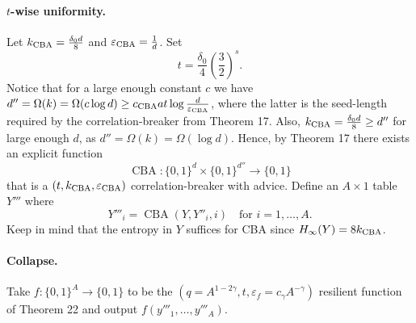 \documentclass[10pt,a4paper]{article}
\DeclareMathOperator{\CBA}{CBA}
\begin{document}
\paragraph{$t$-wise uniformity.} Let $k_{\rm CBA}=\frac{\delta_0d}8$ and $\varepsilon_{\rm CBA}=\frac1d$. Set
\[t=\frac{\delta_0}4\left(\frac32\right)^s.\]
Notice that for a large enough constant $c$ we have $d''=\Omega(k)=\Omega(c\log d)\ge c_{\rm CBA}at\log\frac d{\varepsilon_{\rm CBA}}$, where the latter is the seed-length required by the correlation-breaker from Theorem 17. Also, $k_{\rm CBA}=\frac{\delta_0d}8\ge d''$ for large enough $d$, as $d''=\Omega(k)=\Omega(\log d)$. Hence, by Theorem 17 there exists an explicit function
\[\CBA:\{0,1\}^d\times\{0,1\}^{d''}\to\{0,1\}\]
that is a $(t,k_{\rm CBA},\varepsilon_{\rm CBA})$ correlation-breaker with advice.
Define an $A\times1$ table $Y'''$ where
\[Y'''_i=\CBA(Y,Y''_i,i)\quad\text{for }i=1,\ldots,A.\]
Keep in mind that the entropy in $Y$ suffices for CBA since $H_\infty(Y)=8k_{\rm CBA}$.
\paragraph{Collapse.} Take $f:\{0,1\}^A\to\{0,1\}$ to be the $(q=A^{1-2\gamma},t,\varepsilon_f=c_\gamma A^{-\gamma})$ resilient function of Theorem 22 and output $f(y'''_1,\ldots,y'''_A)$.
\end{document}
